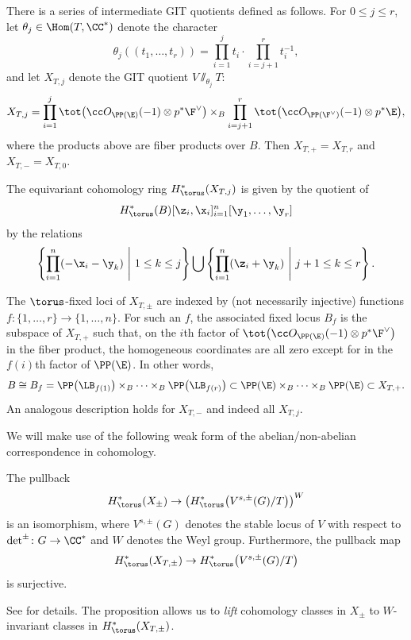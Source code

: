 There is a series of intermediate GIT quotients defined as follows. For $0\leq j \leq r$, let $\theta_j \in \Hom(T, \CC^*)$ denote the character
\[
\theta_j ((t_1, \dots, t_r)) = \prod_{i=1}^{j} t_i \cdot \prod_{i=j+1}^r t_i^{-1},
\]
and let $X_{T, j}$ denote the GIT quotient $ V \sslash_{\theta_j} T$:
\[
X_{T, j} = \prod_{i=1}^{j} \tot \bigl( \cc O_{\PP(\E)}(-1) \otimes p^*\F^\vee\bigr) \times_B \prod_{i=j+1}^{r} \tot \bigl( \cc O_{\PP(\F^\vee)}(-1) \otimes p^*\E\bigr),
\]
where the products above are fiber products over $B$. Then $X_{T, {+}} = X_{T, r}$ and $X_{T, {-}} = X_{T, 0}$.

The equivariant cohomology ring $H^*_\torus(X_{T, j})$ is given by the quotient of
\[
H^*_\torus(B)[\z_i, \x_i]_{i=1}^n[\y_1, \dots, \y_r]
\]
by the relations
\begin{equation}\label{e:rels}
\left\{\prod_{i=1}^n (- \x_i - \y_k)\ \middle|\ 1 \leq k \leq j\right\} \bigcup \left\{\prod_{i=1}^n (\z_i + \y_k)\ \middle|\ j+1 \leq k \leq r\right\}.
\end{equation}

The $\torus$-fixed loci of $X_{T, \pm}$ are indexed by (not necessarily injective) functions $f\colon \{1, \dots, r\} \to \{1, \dots, n\}$. For such an $f$, the associated fixed locus $B_f$ is the subspace of $X_{T, +}$ such that, on the $i$th factor of
$\tot \bigl( \cc O_{\PP(\E)}(-1) \otimes p^*\F^\vee\bigr)$ in the fiber product, the homogeneous coordinates are all zero except for in the $f(i)$th factor of $\PP(\E)$.
In other words,
\[
B \cong B_f = \PP\bigl(\LB_{f(1)}\bigr) \times_B \cdots \times_B \PP\bigl(\LB_{f(r)}\bigr) \subset \PP(\E) \times_B \cdots \times_B \PP(\E) \subset X_{T, +}.
\]
An analogous description holds for $X_{T, -}$ and indeed all $X_{T, j}$.

We will make use of the following weak form of the abelian/non-abelian correspondence in cohomology.

\begin{Proposition}\label{p:pull}
The pullback
\[
H^*_\torus(X_\pm) \to \bigl(H^*_\torus\bigl( V^{s, \pm}(G)/T\bigr)\bigr)^W
\]
is an isomorphism, where $V^{s, \pm}(G)$ denotes the stable locus of $V$ with respect to $\det^{\pm}\colon G \to \CC^*$ and $W$ denotes the Weyl group. Furthermore, the pullback map
\[
H^*_\torus(X_{T, \pm}) \to H^*_\torus\bigl( V^{s, \pm}(G)/T\bigr)
\]
is surjective.
\end{Proposition}

See \cite[Proposition 1]{Brion} for details.
The proposition allows us to \emph{lift} cohomology classes in $X_{\pm}$ to $W$-invariant classes in $H^*_\torus(X_{T, \pm})$.

